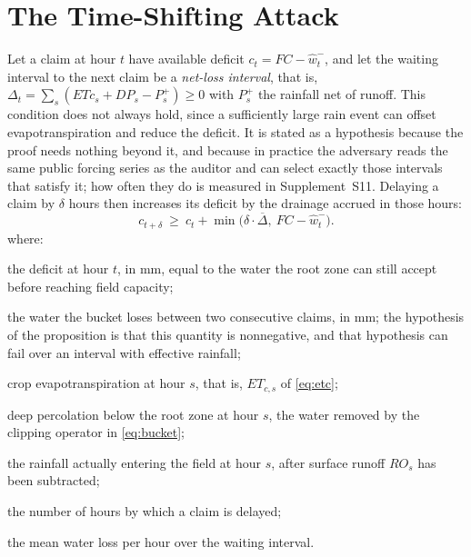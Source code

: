 \section{The Time-Shifting Attack}
\label{sec:timeshift}

\begin{proposition}
\label{prop:coincide}
Let a claim at hour $t$ have available deficit $c_t=FC-\hat w_t^{-}$, and let the
waiting interval to the next claim be a \emph{net-loss interval}, that is,
$\Delta_t=\sum_{s}(\mathit{ETc}_s+\mathit{DP}_s-P_s^{+})\ge 0$ with $P_s^{+}$ the
rainfall net of runoff. This condition does not always hold, since a sufficiently
large rain event can offset evapotranspiration and reduce the deficit. It is stated
as a hypothesis because the proof needs nothing beyond it, and because in practice
the adversary reads the same public forcing series as the auditor and can select
exactly those intervals that satisfy it; how often they do is measured in
Supplement~S11. Delaying a claim by $\delta$ hours then increases its deficit by the
drainage accrued in those hours:
\begin{equation}
c_{t+\delta}\ \ge\ c_t+\min\!\bigl(\delta\cdot\overline{\Delta},\ FC-\hat w_t^{-}\bigr).
\label{eq:delay}
\end{equation}
where:
\begin{symbolist}
\item[$c_t$] the deficit at hour $t$, in mm, equal to the water the root zone can
  still accept before reaching field capacity;
\item[$\Delta_t$] the water the bucket loses between two consecutive claims, in mm;
  the hypothesis of the proposition is that this quantity is nonnegative, and that
  hypothesis can fail over an interval with effective rainfall;
\item[$\mathit{ETc}_s$] crop evapotranspiration at hour $s$, that is, $ET_{c,s}$ of
  \eqref{eq:etc};
\item[$\mathit{DP}_s$] deep percolation below the root zone at hour $s$, the water
  removed by the clipping operator in \eqref{eq:bucket};
\item[$P_s^{+}$] the rainfall actually entering the field at hour $s$, after surface
  runoff $RO_s$ has been subtracted;
\item[$\delta$] the number of hours by which a claim is delayed;
\item[$\overline{\Delta}$] the mean water loss per hour over the waiting interval.
\end{symbolist}


\end{proposition}

